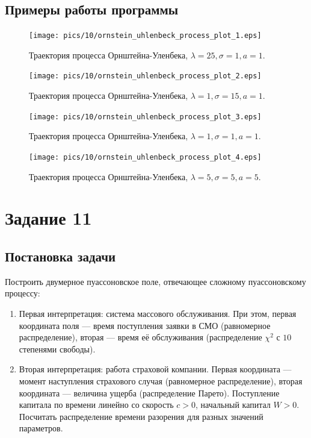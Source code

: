 \documentclass[11pt]{article}
\begin{document}
\subsection{Примеры работы программы}
\begin{figure}[h!]
	\centering
	\texttt{[image: pics/10/ornstein\_uhlenbeck\_process\_plot\_1.eps]}
	\caption{Траектория процесса Орнштейна-Уленбека, $\lambda = 25, \sigma = 1, a = 1$.}
\end{figure}
\begin{figure}[h!]
	\centering
	\texttt{[image: pics/10/ornstein\_uhlenbeck\_process\_plot\_2.eps]}
	\caption{Траектория процесса Орнштейна-Уленбека, $\lambda = 1, \sigma = 15, a = 1$.}
\end{figure}
\begin{figure}[h!]
	\centering
	\texttt{[image: pics/10/ornstein\_uhlenbeck\_process\_plot\_3.eps]}
	\caption{Траектория процесса Орнштейна-Уленбека, $\lambda = 1, \sigma = 1, a = 1$.}
\end{figure}
\begin{figure}[h!]
	\centering
	\texttt{[image: pics/10/ornstein\_uhlenbeck\_process\_plot\_4.eps]}
	\caption{Траектория процесса Орнштейна-Уленбека, $\lambda = 5, \sigma = 5, a = 5$.}
\end{figure}
\pagebreak
\section{Задание 11}
\subsection{Постановка задачи}
Построить двумерное пуассоновское поле, отвечающее сложному пуассоновскому процессу:
\begin{enumerate}
\item Первая интерпретация: система массового обслуживания. При этом, первая координата поля --- время поступления заявки в СМО (равномерное распределение), вторая --- время её обслуживания (распределение $\chi^2$ с $10$ степенями свободы).
\item Вторая интерпретация: работа страховой компании. Первая координата --- момент наступления страхового случая (равномерное распределение), вторая координата --- величина ущерба (распределение Парето). Поступление капитала по времени линейно со скорость $c > 0$, начальный капитал $W > 0$. Посчитать распределение времени разорения для разных значений параметров.
\end{enumerate}
\end{document}
